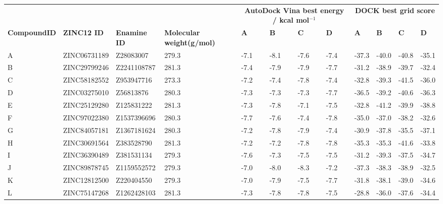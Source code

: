 \begin{table}
\centering

\begin{footnotesize}
\begin{tabular}{ p{2cm} l l p{3cm} l l l l l l l l }
\hline
      &       &       &       & \multicolumn{4}{c}{\textbf{AutoDock Vina best energy / kcal mol$^{-1}$}} & \multicolumn{4}{c}{\textbf{DOCK best grid score}} \\
\textbf{Compound\newline ID} & \textbf{ZINC12 ID} & \textbf{Enamine ID} & \textbf{Molecular weight\newline (g/mol)} & \textbf{A} & \textbf{B} & \textbf{C} & \textbf{D} & \textbf{A} & \textbf{B} & \textbf{C} & \textbf{D} \\
\hline
A     & ZINC06731189 & Z28083007   & 279.3 & -7.1  & -8.1  & -7.6  & -7.4  & -37.3 & -40.0 & -40.8 & -35.1 \\
B     & ZINC29799246 & Z2241108787 & 281.3 & -7.4  & -7.9  & -7.9  & -7.7  & -31.2 & -38.9 & -39.7 & -32.4 \\
C     & ZINC58182552 & Z953947716  & 273.3 & -7.2  & -7.4  & -7.8  & -7.4  & -32.8 & -39.3 & -41.5 & -36.0 \\
D     & ZINC03275010 & Z56813876   & 280.3 & -7.3  & -7.3  & -7.3  & -7.7  & -36.5 & -39.2 & -40.6 & -36.3 \\
E     & ZINC25129280 & Z125831222  & 281.3 & -7.3  & -7.8  & -7.1  & -7.5  & -32.8 & -41.2 & -39.9 & -38.8 \\
F     & ZINC97022380 & Z1537396696 & 280.3 & -7.7  & -7.6  & -7.4  & -7.8  & -35.0 & -37.0 & -38.2 & -32.6 \\
G     & ZINC84057181 & Z1367181624 & 280.3 & -7.2  & -7.8  & -7.9  & -7.4  & -30.9 & -37.8 & -35.5 & -37.1 \\
H     & ZINC30691564 & Z383528790  & 281.3 & -7.2  & -7.2  & -7.8  & -7.8  & -35.3 & -35.3 & -41.6 & -33.8 \\
I     & ZINC36390489 & Z381531134  & 279.3 & -7.6  & -7.3  & -7.5  & -7.5  & -31.2 & -39.3 & -37.5 & -34.7 \\
J     & ZINC89878745 & Z1159552572 & 279.3 & -7.0  & -8.0  & -8.3  & -7.2  & -37.3 & -38.3 & -38.9 & -32.5 \\
K     & ZINC12812500 & Z220404550  & 279.3 & -7.0  & -7.9  & -7.5  & -7.7  & -31.8 & -38.1 & -39.0 & -34.6 \\
L     & ZINC75147268 & Z1262428103 & 281.3 & -7.3  & -7.8  & -7.8  & -7.5  & -28.8 & -36.0 & -37.6 & -34.4 \\

\end{tabular}
\end{footnotesize}
\end{table}
